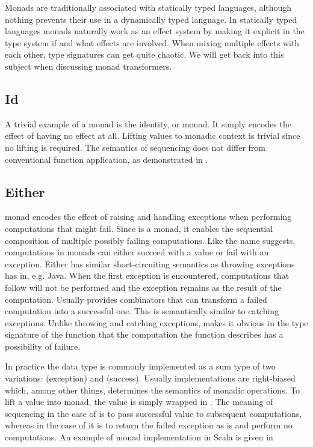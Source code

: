 Monads are traditionally associated with statically typed languages, although nothing prevents their use in a dynamically typed language. In statically typed languages monads naturally work as an effect system by making it explicit in the type system if and what effects are involved. When mixing multiple effects with each other, type signatures can get quite chaotic. We will get back into this subject when discussing monad transformers.


\subsection{Id}
A trivial example of a monad is the identity, or  monad. It simply encodes the effect of having no effect at all. Lifting values to monadic context is trivial since no lifting is required. The semantics of sequencing does not differ from conventional function application, as demonstrated in .




\subsection{Either} \label{background:monads:either}
 monad encodes the effect of raising and handling exceptions when performing computations that might fail. Since  is a monad, it enables the sequential composition of multiple possibly failing computations. Like the name suggests, computations in  monads can either succeed with a value or fail with an exception. Either has similar short-circuiting semantics as throwing exceptions has in, e.g. Java. When the first exception is encountered, computations that follow will not be performed and the exception remains as the result of the computation. Usually  provides combinators that can transform a failed computation into a successful one. This is semantically similar to catching exceptions. Unlike throwing and catching exceptions,  makes it obvious in the type signature of the function that the computation the function describes has a possibility of failure.

In practice the  data type is commonly implemented as a sum type of two variations:  (exception) and  (success). Usually implementations are right-biased which, among other things, determines the semantics of monadic operations. To lift a value into  monad, the value is simply wrapped in . The meaning of sequencing in the case of  is to pass successful value to subsequent computations, whereas in the case of  it is to return the failed exception as is and perform no computations. An example of  monad implementation in Scala is given in 

